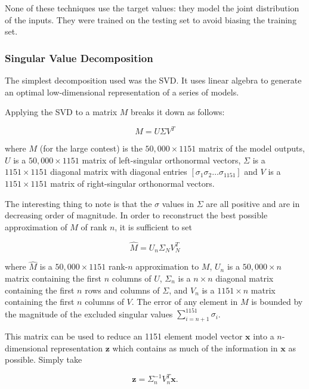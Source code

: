 \documentclass{article}
\begin{document}
None of these techniques use the target values: they model the joint distribution of the inputs.  
They were trained on the testing set to avoid biasing the training set.

\subsubsection{Singular Value Decomposition}

The simplest decomposition used was the SVD.  It uses linear algebra to generate an optimal low-dimensional representation of a series of models.

Applying the SVD to a matrix $M$ breaks it down as follows:

\begin{equation}
M = U \Sigma V^T
\end{equation}

where $M$ (for the large contest) is the $50,000 \times 1151$ matrix of the model outputs, $U$ is a $50,000 \times 1151$ matrix of left-singular orthonormal vectors, $\Sigma$ is a $1151 \times 1151$ diagonal matrix with diagonal entries $[ \sigma_1 \sigma_2 \ldots \sigma_{1151}]$ and $V$ is a $1151 \times 1151$ matrix of right-singular orthonormal vectors.

The interesting thing to note is that the $\sigma$ values in $\Sigma$ are all positive and are in decreasing order of magnitude.  In order to reconstruct the best possible approximation of $M$ of rank $n$, it is sufficient to set

\begin{equation}
\hat{M} = U_n \Sigma_N V_N^T
\end{equation}

where $\hat{M}$ is a $50,000 \times 1151$ rank-$n$ approximation to $M$, $U_n$ is a $50,000 \times n$ matrix containing the first $n$ columns of $U$, $\Sigma_n$ is a $n \times n$ diagonal matrix containing the first $n$ rows and columns of $\Sigma$, and $V_n$ is a $1151 \times n$ matrix containing the first $n$ columns of $V$.  The error of any element in $M$ is bounded by the magnitude of the excluded singular values $\sum_{i=n+1}^{1151} \sigma_i$.

This matrix can be used to reduce an 1151 element model vector $\mathbf{x}$ into a $n$-dimensional representation $\mathbf{z}$ which contains as much of the information in $\mathbf{x}$ as possible.  Simply take

\begin{equation}
\label{eqn:svd-encode}
\mathbf{z} = \Sigma_n^{-1} V_n^T \mathbf{x} .
\end{equation}
\end{document}
